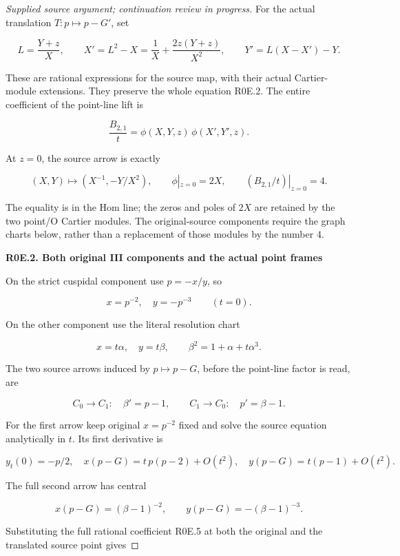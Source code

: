 \begin{proof}[Supplied source argument; continuation review in progress]
For the actual translation \(T:p\mapsto p-G'\), set

\[
 L=\frac{Y+z}{X},\qquad
 X'=L^2-X=\frac1X+\frac{2z(Y+z)}{X^2},\qquad
 Y'=L(X-X')-Y.
 \tag{R0E.6}
\]

These are rational expressions for the source map, with their actual
Cartier-module extensions. They preserve the whole equation R0E.2.
The entire coefficient of the point-line lift is

\[
 \frac{B_{2,1}}{t}
     =\phi(X,Y,z)\,\phi(X',Y',z).
 \tag{R0E.7}
\]

At \(z=0\), the source arrow is exactly

\[
 (X,Y)\longmapsto(X^{-1},-Y/X^2),\qquad
 \phi|_{z=0}=2X,
 \qquad (B_{2,1}/t)|_{z=0}=4.
 \tag{R0E.8}
\]

The equality is in the Hom line; the zeros and poles of \(2X\)
are retained by the two point/O Cartier modules. The original-source
components require the graph charts below, rather than a replacement
of those modules by the number \(4\).

\par

\medskip\noindent\textbf{R0E.2. Both original III components and the actual point frames}

\par\nobreak

On the strict cuspidal component use \(p=-x/y\), so

\[
 x=p^{-2},\quad y=-p^{-3}\qquad(t=0).
 \tag{R0E.9}
\]

On the other component use the literal resolution chart

\[
 x=t\alpha,\quad y=t\beta,\qquad
 \beta^2=1+\alpha+t\alpha^3.
 \tag{R0E.10}
\]

The two source arrows induced by \(p\mapsto p-G\), before the
point-line factor is read, are

\[
 C_0\longrightarrow C_1:\quad \beta'=p-1,
 \qquad
 C_1\longrightarrow C_0:\quad p'=\beta-1.
 \tag{R0E.11}
\]

For the first arrow keep original \(x=p^{-2}\) fixed and solve the
source equation analytically in \(t\). Its first derivative is

\[
 y_t(0)=-p/2,\quad x(p-G)=t\,p(p-2)+O(t^2),
 \quad y(p-G)=t(p-1)+O(t^2).
 \tag{R0E.12}
\]

The full second arrow has central

\[
 x(p-G)=(\beta-1)^{-2},\qquad
 y(p-G)=-(\beta-1)^{-3}.
 \tag{R0E.13}
\]

Substituting the full rational coefficient R0E.5 at both the original
and the translated source point gives


\end{proof}
